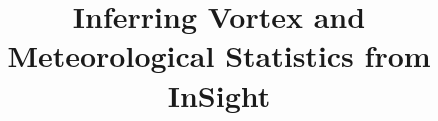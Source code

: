 \documentclass{aastex63}
\begin{document}
\title{Inferring Vortex and Meteorological Statistics from InSight}


\end{document}
